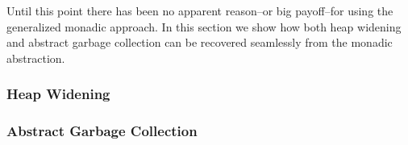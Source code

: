 Until this point there has been no apparent reason--or big payoff--for using
the generalized monadic approach.
%
In this section we show how both heap widening and abstract garbage collection
can be recovered seamlessly from the monadic abstraction.


\subsubsection{Heap Widening}


\subsubsection{Abstract Garbage Collection}

